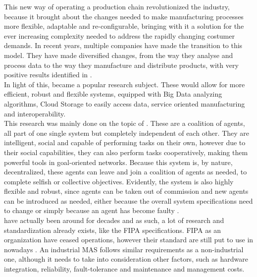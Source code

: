 This new way of operating a production chain revolutionized the industry, because it brought about the changes needed to make manufacturing processes more flexible, adaptable and re-configurable, bringing with it a solution for the ever increasing complexity needed to address the rapidly changing costumer demands.
In recent years, multiple companies have made the transition to this model. They have made diversified changes, from the way they analyse and process data to the way they manufacture and distribute products, with very positive results identified in \cite{rit01}.\\

In light of this,  became a popular research subject. These  would allow for more efficient, robust and flexible systems, equipped with Big Data analyzing algorithms, Cloud Storage to easily access data, service oriented manufacturing and interoperability.\\

This research was mainly done on the topic of  \cite{sakurada01} \cite{karnouskos01}. These  are a coalition of agents, all part of one single system but completely independent of each other. They are intelligent, social and capable of performing tasks on their own, however due to their social capabilities, they can also perform tasks cooperatively, making them powerful tools in goal-oriented networks. Because this system is, by nature, decentralized, these agents can leave and join a coalition of agents as needed, to complete selfish or collective objectives. Evidently, the system is also highly flexible and robust, since agents can be taken out of commission and new agents can be introduced as needed, either because the overall system specifications need to change or simply because an agent has become faulty \cite{paulo02}. \\

 have actually been around for decades and as such, a lot of research and standardization already exists, like the \gls{FIPA} specifications. \gls{FIPA} as an organization have ceased operations, however their standard are still put to use in  nowadays \cite{FIPA_website}. An industrial \acrshort{MAS} follows similar requirements as a non-industrial one, although it needs to take into consideration other factors, such as hardware integration, reliability, fault-tolerance and maintenance and management costs.\\

